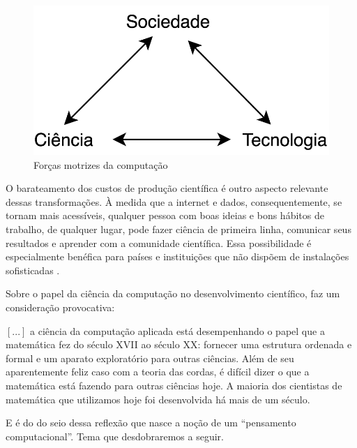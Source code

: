 \begin{figure}[htb]
	\caption{Forças motrizes da computação}
	\begin{center}
	    \includegraphics[scale=0.28]{imagens/forcas_motriz.png}
	\end{center}
\end{figure}

O barateamento dos custos de produção científica é outro aspecto relevante dessas transformações. À medida que a internet e dados, consequentemente, se tornam mais acessíveis, qualquer pessoa com boas ideias e bons hábitos de trabalho, de qualquer lugar, pode fazer ciência de primeira linha, comunicar seus resultados e aprender com a comunidade científica. Essa possibilidade é especialmente benéfica para países e instituições que não dispõem de instalações sofisticadas \cite[]{Djorgovski2005}. 

Sobre o papel da ciência da computação no desenvolvimento científico,  faz um consideração provocativa: 

\begin{citacao}
	$[...]$ a ciência da computação aplicada está desempenhando o papel que a matemática fez do século XVII ao século XX: fornecer uma estrutura ordenada e formal e um aparato exploratório para outras ciências. Além de seu aparentemente feliz caso com a teoria das cordas, é difícil dizer o que a matemática está fazendo para outras ciências hoje. A maioria dos cientistas de matemática que utilizamos hoje foi desenvolvida há mais de um século. \cite[p.~131. Tradução nossa]{Djorgovski2005}
\end{citacao}

E é do do seio dessa reflexão que nasce a noção de um ``pensamento computacional''. Tema que desdobraremos a seguir.

\vspace{1cm}

